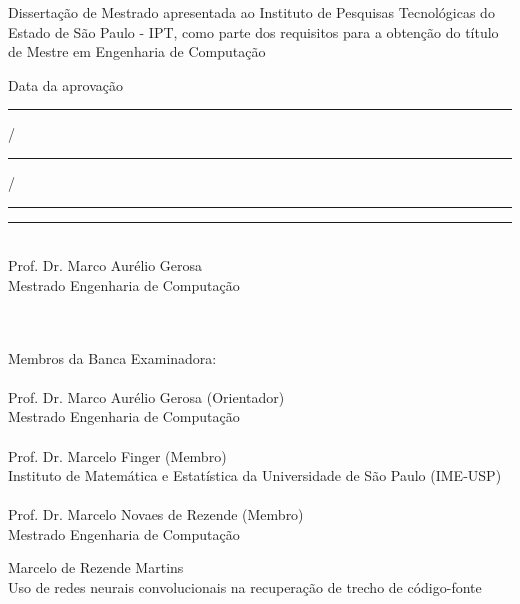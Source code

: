 \documentclass[12pt,oneside,a4paper]{book} %
\begin{document}
    \vskip 2cm

    \hspace{6cm}\begin{minipage}{0.48\linewidth}
	Dissertação de Mestrado apresentada
	ao Instituto de Pesquisas Tecnológicas do\\
	Estado de São Paulo - IPT, como 
	parte dos requisitos para a obtenção do 
	título de Mestre em Engenharia de 
	Computação
    \end{minipage}
    
    \vskip 2cm
    
    \hspace{6cm}\begin{minipage}{0.48\linewidth}
	Data da aprovação \rule{0.7cm}{0.4pt}/\rule{0.7cm}{0.4pt}/\rule{1.4cm}{0.4pt}
    \end{minipage}
    
    \vskip 2cm
    
    \hspace{6cm}\begin{minipage}{0.48\linewidth}
	\rule{7cm}{0.4pt}\\
	Prof. Dr. Marco Aurélio Gerosa\\
	Mestrado Engenharia de Computação\\
    \end{minipage}
\\
\\
Membros da Banca Examinadora:\\ 
\\
Prof. Dr. Marco Aurélio Gerosa (Orientador)\\
Mestrado Engenharia de Computação\\
\\
Prof. Dr. Marcelo Finger (Membro)\\
Instituto de Matemática e Estatística da Universidade de São Paulo (IME-USP)\\
\\
Prof. Dr. Marcelo Novaes de Rezende (Membro)\\
Mestrado Engenharia de Computação\\


\pagebreak


%
%
%
%
\newpage
\thispagestyle{empty}
    \begin{center}
        Marcelo de Rezende Martins\\
        \vspace*{2.3 cm}
        Uso de redes neurais convolucionais na recuperação de trecho de código-fonte\\
        \vspace*{2 cm}
    \end{center}
\end{document}

